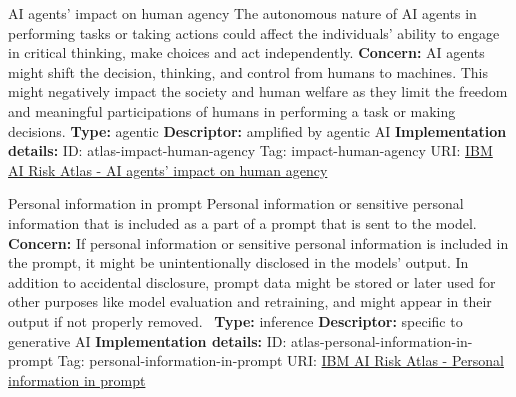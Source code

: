 \begin{definitionbox}{AI agents' impact on human agency}
The autonomous nature of AI agents in performing tasks or taking actions could affect the individuals' ability to engage in critical thinking, make choices and act independently.\newline\newline
\textbf{Concern: }AI agents might shift the decision, thinking, and control from humans to machines.  This might negatively impact the society and human welfare as they limit the freedom and meaningful participations of humans in performing a task or making decisions. \newline\newline
\textbf{Type: }agentic\newline
\textbf{Descriptor: }amplified by agentic AI \newline\newline
\textbf{Implementation details: } \newline
ID: atlas-impact-human-agency \newline
Tag: impact-human-agency \newline
URI:  \href{https://www.ibm.com/docs/en/watsonx/saas?topic=SSYOK8/wsj/ai-risk-atlas/impact-human-agency.html}{IBM AI Risk Atlas - AI agents' impact on human agency}\newline
\end{definitionbox}
\begin{definitionbox}{Personal information in prompt}
Personal information or sensitive personal information that is included as a part of a prompt that is sent to the model.\newline\newline
\textbf{Concern: }If personal information or sensitive personal information is included in the prompt, it might be unintentionally disclosed in the models' output. In addition to accidental disclosure, prompt data might be stored or later used for other purposes like model evaluation and retraining, and might appear in their output if not properly removed. \newline\newline
\textbf{Type: }inference\newline
\textbf{Descriptor: }specific to generative AI \newline\newline
\textbf{Implementation details: } \newline
ID: atlas-personal-information-in-prompt \newline
Tag: personal-information-in-prompt \newline
URI:  \href{https://www.ibm.com/docs/en/watsonx/saas?topic=SSYOK8/wsj/ai-risk-atlas/personal-information-in-prompt.html}{IBM AI Risk Atlas - Personal information in prompt}\newline
\end{definitionbox}
